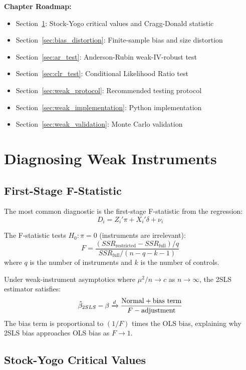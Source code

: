\textbf{Chapter Roadmap:}
\begin{itemize}
    \item Section~\ref{sec:diagnosing_weak}: Stock-Yogo critical values and Cragg-Donald statistic
    \item Section~\ref{sec:bias_distortion}: Finite-sample bias and size distortion
    \item Section~\ref{sec:ar_test}: Anderson-Rubin weak-IV-robust test
    \item Section~\ref{sec:clr_test}: Conditional Likelihood Ratio test
    \item Section~\ref{sec:weak_protocol}: Recommended testing protocol
    \item Section~\ref{sec:weak_implementation}: Python implementation
    \item Section~\ref{sec:weak_validation}: Monte Carlo validation
\end{itemize}


\section{Diagnosing Weak Instruments}
\label{sec:diagnosing_weak}

\subsection{First-Stage F-Statistic}

The most common diagnostic is the first-stage F-statistic from the regression:
\[
D_i = Z_i'\pi + X_i'\delta + \nu_i
\]

The F-statistic tests $H_0: \pi = 0$ (instruments are irrelevant):
\[
F = \frac{(SSR_{\text{restricted}} - SSR_{\text{full}})/q}{SSR_{\text{full}}/(n - q - k - 1)}
\]
where $q$ is the number of instruments and $k$ is the number of controls.

\begin{theorem}
\label{thm:staiger_stock}
Under weak-instrument asymptotics where $\mu^2/n \to c$ as $n \to \infty$, the 2SLS estimator satisfies:
\[
\hat{\beta}_{2SLS} - \beta \xrightarrow{d} \frac{\text{Normal} + \text{bias term}}{F - \text{adjustment}}
\]
The bias term is proportional to $(1/F)$ times the OLS bias, explaining why 2SLS bias approaches OLS bias as $F \to 1$.
\end{theorem}

\subsection{Stock-Yogo Critical Values}

